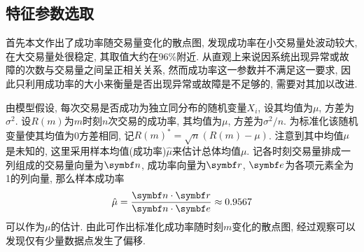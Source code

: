 \subsection{特征参数选取}

首先本文作出了成功率随交易量变化的散点图, 发现成功率在小交易量处波动较大, 在大交易量处很稳定, 其取值大约在96\%附近. 从直观上来说因系统出现异常或故障的次数与交易量之间呈正相关关系, 然而成功率这一参数并不满足这一要求, 因此只利用成功率的大小来衡量是否出现异常或故障是不足够的, 需要对其加以改进.

由模型假设, 每次交易是否成功为独立同分布的随机变量$X_{i}$, 设其均值为$\mu$, 方差为$\sigma^{2}$. 
设$R(m)$为$m$时刻$n$次交易的成功率, 其均值为$\mu$, 方差为$\sigma^{2}/n$. 为标准化该随机变量使其均值为0方差相同, 记$R(m)^{*}=\sqrt{n}(R(m)-\mu)$. 注意到其中均值$\mu$是未知的, 这里采用样本均值(成功率)$\hat{\mu}$来估计总体均值$\mu$.
记各时刻交易量排成一列组成的交易量向量为$\vect{n}$, 成功率向量为$\vect{r}$, $\vect{e}$为各项元素全为1的列向量, 那么样本成功率
\begin{equation}
    \hat{\mu} = \frac{\vect{n} \cdot \vect{r}}{\vect{n} \cdot \vect{e}} \approx 0.9567
\end{equation}
可以作为$\mu$的估计.
由此可作出标准化成功率随时刻$m$变化的散点图, 经过观察可以发现仅有少量数据点发生了偏移.

\begin{figure}[htb]
    \begin{minipage}[b]{0.49\textwidth}
        \centering
    \end{minipage}
    \hfill
    \begin{minipage}[b]{0.49\textwidth}
        \centering
    \end{minipage}
\end{figure}

